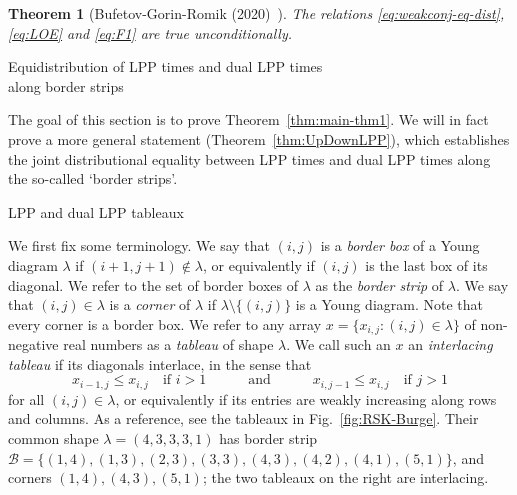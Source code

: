 \documentclass[a4paper,reqno,12pt]{amsart}
\makeatletter
\theoremstyle{plain}
\newtheorem{thm}{Theorem}[section]
\theoremstyle{definition}
\renewcommand\section{\@startsection{section}{1}%
\z@{.7\linespacing\@plus\linespacing}{.5\linespacing}%
{\large\bfseries\scshape\centering}}
\renewcommand\subsection{\@startsection{subsection}{2}%
  \z@{.5\linespacing\@plus.7\linespacing}{-.5em}%
  {\bfseries\scshape}}
\newcommand{\firstmention}{\emph}
\newcommand{\1}{\mathbbm{1}}
\newcommand{\Fro}{\mathcal{B}}
\makeatother
\begin{document}
\begin{thm}[Bufetov-Gorin-Romik (2020)~\cite{bufetovGorinRomik21}]
The relations \eqref{eq:weakconj-eq-dist}, \eqref{eq:LOE} and \eqref{eq:F1} are true unconditionally.
\end{thm}



\section{Equidistribution of LPP times and dual LPP times \\ along border strips}
\label{sec:LPP}

The goal of this section is to prove Theorem~\ref{thm:main-thm1}.
We will in fact prove a more general statement (Theorem~\ref{thm:UpDownLPP}), which establishes the joint distributional equality between LPP times and dual LPP times along the so-called `border strips'.

\subsection{LPP and dual LPP tableaux}
\label{subsec:LPP-dualLPP}

We first fix some terminology.
We say that $(i,j)$ is a \firstmention{border box} of a Young diagram $\lambda$ if $(i+1,j+1)\notin \lambda$, or equivalently if $(i,j)$ is the last box of its diagonal.
We refer to the set of border boxes of $\lambda$ as the \emph{border strip} of $\lambda$.
We say that $(i,j)\in \lambda$ is a \emph{corner} of $\lambda$ if $\lambda\setminus\{(i,j)\}$ is a Young diagram.
Note that every corner is a border box.
We refer to any array $x=\{x_{i,j}\colon (i,j)\in\lambda\}$ of non-negative real numbers as a \emph{tableau} of shape $\lambda$.
We call such an $x$ an \emph{interlacing tableau} if its diagonals interlace, in the sense that
\begin{equation}
\label{eq:interlacing}
x_{i-1,j} \leq x_{i,j} \quad \text{if } i>1
\qquad\quad \text{and} \qquad\quad
x_{i,j-1} \leq x_{i,j} \quad \text{if } j>1
\end{equation}
for all $(i,j)\in\lambda$, or equivalently if its entries are weakly increasing along rows and columns.
As a reference, see the tableaux in Fig.~\ref{fig:RSK-Burge}.
Their common shape $\lambda=(4,3,3,3,1)$ has border strip $\Fro=\{(1,4), (1,3), (2,3), (3,3), (4,3), (4,2), (4,1), (5,1)\}$, and corners $(1,4), (4,3), (5,1)$; the two tableaux on the right are interlacing.
\end{document}
